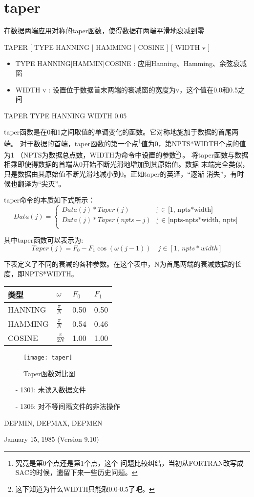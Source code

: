 \section{taper}
\label{cmd:taper}

在数据两端应用对称的taper函数，使得数据在两端平滑地衰减到零

TAPER [ TYPE HANNING | HAMMING | COSINE ] [ WIDTH v ]

\begin{itemize}
\item TYPE HANNING|HAMMIN|COSINE : 应用Hanning、Hamming、余弦衰减窗
\item WIDTH v : 设置位于数据首末两端的衰减窗的宽度为v，这个值在0.0和0.5之间
\end{itemize}

TAPER TYPE HANNING WIDTH 0.05

taper函数是在0和1之间取值的单调变化的函数。它对称地施加于数据的首尾两端。
对于数据的首端，taper函数的第一个点\footnote{究竟是第0个点还是第1个点，这个
问题比较纠结，当初从FORTRAN改写成SAC的时候，遗留下来一些历史问题。}值为0，第NPTS*WIDTH个点的值为1
（NPTS为数据总点数，WIDTH为命令中设置的参数\footnote{这下知道为什么WIDTH只能取0.0-0.5了吧。}）。
将taper函数与数据相乘即使得数据的首端从0开始不断光滑地增加到其原始值。数据
末端完全类似，只是数据由其原始值不断光滑地减小到0。正如taper的英译，``逐渐
消失''，有时候也翻译为``尖灭''。

taper命令的本质如下式所示：
\begin{displaymath}
Data(j) = \left\{
		  \begin{array}{ll}
		  Data(j)*Taper(j) & \textrm{j $\in$ [1,\ npts*width]} \\
		  Data(j)*Taper(npts-j) & \textrm{j $\in$ [npts-npts*width,\ npts]} \\
		  \end{array}
\right.
\end{displaymath}

其中taper函数可以表示为:
\[ Taper(j)=F_0 - F_1\cos(\omega(j-1))	\quad j \in [1,\ npts*width] \]

下表定义了不同的衰减的各种参数。在这个表中，N为首尾两端的衰减数据的长度，即NPTS*WIDTH。

\begin{center}
\begin{tabular}{llll}
\toprule
类型 & $\omega$ & $F_0$	& $F_1$	\\
\midrule
HANNING	&	$\frac{\pi}{N}$	&	0.50	&	0.50	\\
HAMMING	&	$\frac{\pi}{N}$	&	0.54	&	0.46	\\
COSINE	&	$\frac{\pi}{2N}$	&	1.00	&	1.00	\\
\bottomrule
\end{tabular}
\end{center}

\begin{figure}[h]
\caption{Taper函数对比图}
\centering
\texttt{[image: taper]}
\end{figure}

\begin{itemize}
\item[-]1301: 未读入数据文件
\item[-]1306: 对不等间隔文件的非法操作
\end{itemize}

DEPMIN, DEPMAX, DEPMEN

January 15, 1985 (Version 9.10)
